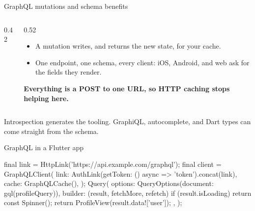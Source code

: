 \documentclass[10pt,aspectratio=169,t]{beamer}
\begin{document}
\begin{frame}[fragile,eyebrow=APIs]{GraphQL mutations and schema benefits}
  \begin{columns}[T]
    \begin{column}{0.42\textwidth}
    \end{column}
    \begin{column}{0.52\textwidth}
      \begin{itemize}
        \item A mutation writes, and returns the new state, for your cache.
        \item One endpoint, one schema, every client: iOS, Android, and web ask for the fields they render.
      \end{itemize}
      \textbf{Everything is a POST to one URL, so HTTP caching stops helping here.}
    \end{column}
  \end{columns}
  \begin{takeaway}{Introspection generates the tooling.}
    GraphiQL, autocomplete, and Dart types can come straight from the schema.
  \end{takeaway}
\end{frame}

\begin{frame}[fragile,eyebrow=APIs]{GraphQL in a Flutter app}
\begin{dart}
final link = HttpLink('https://api.example.com/graphql');
final client = GraphQLClient(
  link: AuthLink(getToken: () async => 'token').concat(link),
  cache: GraphQLCache(),
);
Query(
  options: QueryOptions(document: gql(profileQuery)),
  builder: (result, {fetchMore, refetch}) {
    if (result.isLoading) return const Spinner();
    return ProfileView(result.data!['user']);
  },
);
\end{dart}
\end{frame}
\end{document}
